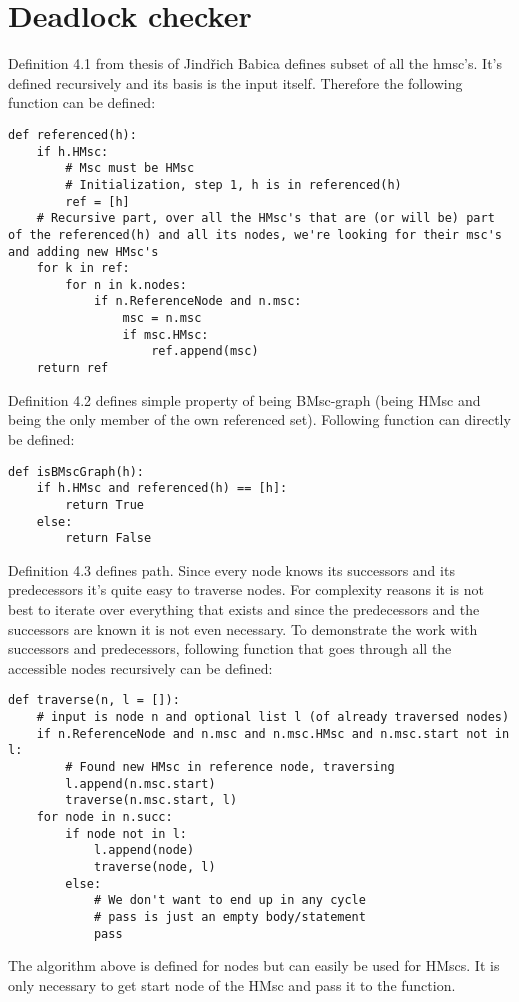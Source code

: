 \documentclass[11pt,oneside]{fithesis2}
\begin{document}
\section{Deadlock checker}
Definition 4.1 from thesis of Jindřich Babica defines subset of all the hmsc's. It's defined recursively and its basis is the input itself. Therefore the following function can be defined:
\begin{lstlisting}
def referenced(h):
    if h.HMsc:
        # Msc must be HMsc
        # Initialization, step 1, h is in referenced(h)
        ref = [h]
    # Recursive part, over all the HMsc's that are (or will be) part of the referenced(h) and all its nodes, we're looking for their msc's and adding new HMsc's
    for k in ref:
        for n in k.nodes:
            if n.ReferenceNode and n.msc:
                msc = n.msc
                if msc.HMsc:
                    ref.append(msc)
    return ref
\end{lstlisting}
Definition 4.2 defines simple property of being BMsc-graph (being HMsc and being the only member of the own referenced set). Following function can directly be defined:
\begin{lstlisting}
def isBMscGraph(h):
    if h.HMsc and referenced(h) == [h]:
        return True
    else:
        return False
\end{lstlisting}
Definition 4.3 defines path. Since every node knows its successors and its predecessors it's quite easy to traverse nodes. For complexity reasons it is not best to iterate over everything that exists and since the predecessors and the successors are known it is not even necessary. To demonstrate the work with successors and predecessors, following function that goes through all the accessible nodes recursively can be defined:
\begin{lstlisting}
def traverse(n, l = []):
    # input is node n and optional list l (of already traversed nodes)
    if n.ReferenceNode and n.msc and n.msc.HMsc and n.msc.start not in l:
        # Found new HMsc in reference node, traversing
        l.append(n.msc.start)
        traverse(n.msc.start, l)
    for node in n.succ:
        if node not in l:
            l.append(node)
            traverse(node, l)
        else:
            # We don't want to end up in any cycle
            # pass is just an empty body/statement
            pass
\end{lstlisting}
The algorithm above is defined for nodes but can easily be used for HMscs. It is only necessary to get start node of the HMsc and pass it to the function.
\end{document}
